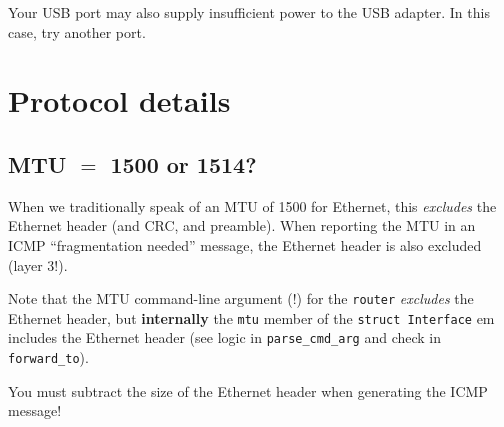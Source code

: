 \documentclass{article}
\begin{document}
Your USB port may also supply insufficient power to the USB adapter.
In this case, try another port.


\section{Protocol details}

\subsection{MTU $=$ 1500 or 1514?}

When we traditionally speak of an MTU of 1500 for Ethernet, this
{\em excludes} the Ethernet header (and CRC, and preamble).  When
reporting the MTU in an ICMP ``fragmentation needed'' message,
the Ethernet header is also excluded (layer 3!).

Note that the MTU command-line argument (!) for the {\tt router} {\em
  excludes} the Ethernet header, but {\bf internally} the \texttt{mtu}
member of the {\tt struct Interface} {em includes} the Ethernet header
(see logic in {\tt parse\_cmd\_arg} and check in {\tt forward\_to}).

You must subtract the size of the Ethernet header when generating the
ICMP message!
\end{document}
